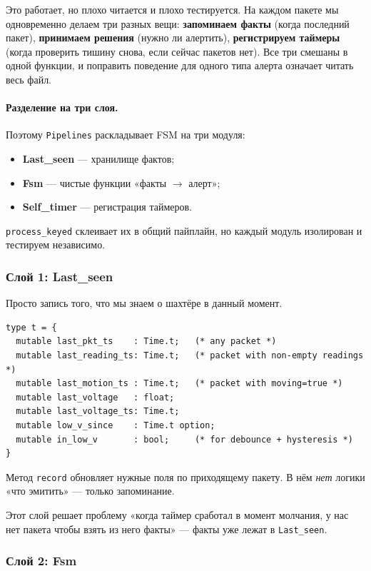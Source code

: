 Это работает, но плохо читается и плохо тестируется. На каждом
пакете мы одновременно делаем три разных вещи:
\textbf{запоминаем факты} (когда последний пакет),
\textbf{принимаем решения} (нужно ли алертить),
\textbf{регистрируем таймеры} (когда проверить тишину снова, если
сейчас пакетов нет). Все три смешаны в одной функции, и поправить
поведение для одного типа алерта означает читать весь файл.

\paragraph{Разделение на три слоя.} Поэтому
\texttt{Pipelines} раскладывает FSM на три модуля:

\begin{itemize}
\item \textbf{Last\_seen} --- хранилище фактов;
\item \textbf{Fsm} --- чистые функции «факты $\to$ алерт»;
\item \textbf{Self\_timer} --- регистрация таймеров.
\end{itemize}

\texttt{process\_keyed} склеивает их в общий пайплайн, но каждый
модуль изолирован и тестируем независимо.

\subsubsection{Слой 1: Last\_seen}

Просто запись того, что мы знаем о шахтёре в данный момент.

\begin{lstlisting}
type t = {
  mutable last_pkt_ts    : Time.t;   (* any packet *)
  mutable last_reading_ts: Time.t;   (* packet with non-empty readings *)
  mutable last_motion_ts : Time.t;   (* packet with moving=true *)
  mutable last_voltage   : float;
  mutable last_voltage_ts: Time.t;
  mutable low_v_since    : Time.t option;
  mutable in_low_v       : bool;     (* for debounce + hysteresis *)
}
\end{lstlisting}

Метод \texttt{record} обновляет нужные поля по приходящему пакету.
В нём \emph{нет} логики «что эмитить» --- только запоминание.

Этот слой решает проблему «когда таймер сработал в момент молчания,
у нас нет пакета чтобы взять из него факты» --- факты уже лежат в
\texttt{Last\_seen}.

\subsubsection{Слой 2: Fsm}

